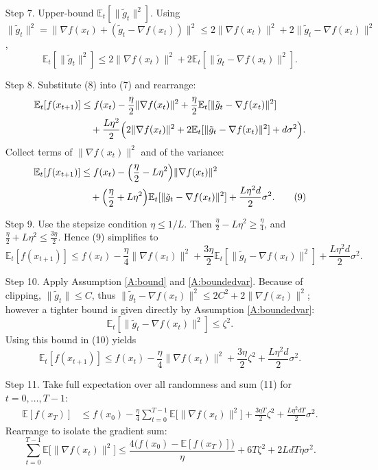 \documentclass[11pt]{article}
\newcommand{\E}{\mathbb{E}}
\newcommand{\grad}{\nabla}
\begin{document}
\begin{enumerate}
\item[Step 7.] Upper‑bound $\E_t[\|\tilde g_t\|^{2}]$.
Using $\|\tilde g_t\|^{2}
 =\|\grad f(x_t)+(\tilde g_t-\grad f(x_t))\|^{2}
 \le 2\|\grad f(x_t)\|^{2}+2\|\tilde g_t-\grad f(x_t)\|^{2}$,
\[
\E_t[\|\tilde g_t\|^{2}]
 \le 2\|\grad f(x_t)\|^{2}+2\E_t[\|\tilde g_t-\grad f(x_t)\|^{2}]. \tag{8}
\]

\item[Step 8.] Substitute (8) into (7) and rearrange:
\[
\begin{aligned}
\E_t[f(x_{t+1})]
 &\le f(x_t)-\frac{\eta}{2}\|\grad f(x_t)\|^{2}
    +\frac{\eta}{2}\E_t[\|\tilde g_t-\grad f(x_t)\|^{2}] \\
 &\quad +\frac{L\eta^{2}}{2}\Bigl(2\|\grad f(x_t)\|^{2}
                +2\E_t[\|\tilde g_t-\grad f(x_t)\|^{2}]
                +d\sigma^{2}\Bigr).
\end{aligned}
\]
Collect terms of $\|\grad f(x_t)\|^{2}$ and of the variance:
\[
\begin{aligned}
\E_t[f(x_{t+1})]
 &\le f(x_t)-\Bigl(\frac{\eta}{2}-L\eta^{2}\Bigr)\|\grad f(x_t)\|^{2}\\
 &\quad +\Bigl(\frac{\eta}{2}+L\eta^{2}\Bigr)\E_t[\|\tilde g_t-\grad f(x_t)\|^{2}]
    +\frac{L\eta^{2}d}{2}\sigma^{2}. \tag{9}
\end{aligned}
\]

\item[Step 9.] Use the stepsize condition $\eta\le 1/L$.
Then $\frac{\eta}{2}-L\eta^{2}\ge \frac{\eta}{4}$, and
$\frac{\eta}{2}+L\eta^{2}\le \frac{3\eta}{2}$.
Hence (9) simplifies to
\[
\E_t[f(x_{t+1})]
 \le f(x_t)-\frac{\eta}{4}\|\grad f(x_t)\|^{2}
    +\frac{3\eta}{2}\E_t[\|\tilde g_t-\grad f(x_t)\|^{2}]
    +\frac{L\eta^{2}d}{2}\sigma^{2}. \tag{10}
\]

\item[Step 10.] Apply Assumption \ref{A:bound} and \ref{A:boundedvar}.
Because of clipping, $\|\tilde g_t\|\le C$, thus $\|\tilde g_t-\grad f(x_t)\|^{2}
\le 2C^{2}+2\|\grad f(x_t)\|^{2}$; however a tighter bound is given directly
by Assumption \ref{A:boundedvar}:
\[
\E_t[\|\tilde g_t-\grad f(x_t)\|^{2}] \le \zeta^{2}.
\]
Using this bound in (10) yields
\[
\E_t[f(x_{t+1})]
 \le f(x_t)-\frac{\eta}{4}\|\grad f(x_t)\|^{2}
    +\frac{3\eta}{2}\zeta^{2}
    +\frac{L\eta^{2}d}{2}\sigma^{2}. \tag{11}
\]

\item[Step 11.] Take full expectation over all randomness and sum (11) for $t=0,\dots,T-1$:
\[
\begin{aligned}
\E[f(x_T)]
 &\le f(x_0)-\frac{\eta}{4}\sum_{t=0}^{T-1}\E\bigl[\|\grad f(x_t)\|^{2}\bigr]
    +\frac{3\eta T}{2}\zeta^{2}
    +\frac{L\eta^{2}d T}{2}\sigma^{2}.
\end{aligned}
\]
Rearrange to isolate the gradient sum:
\[
\sum_{t=0}^{T-1}\E\bigl[\|\grad f(x_t)\|^{2}\bigr]
 \le \frac{4\bigl(f(x_0)-\E[f(x_T)]\bigr)}{\eta}
    +6T\zeta^{2}
    +2LdT\eta\sigma^{2}. \tag{12}
\]


\end{enumerate}
\end{document}
